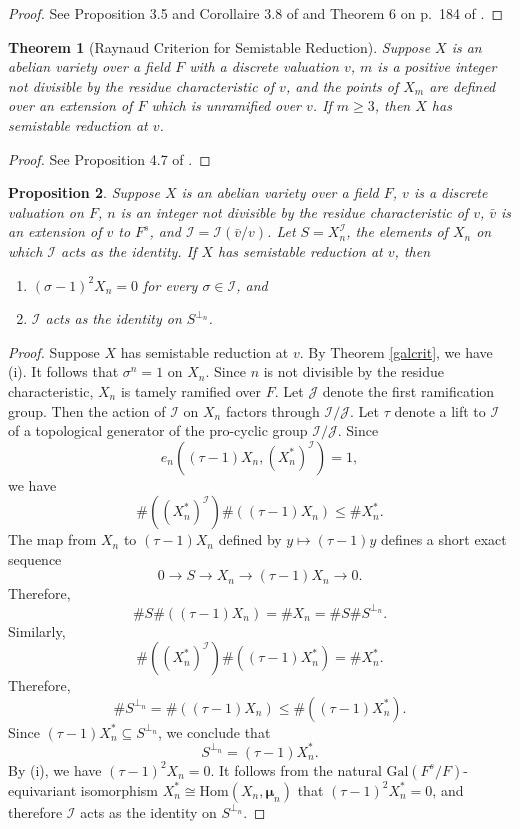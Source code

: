 \documentclass{amsart}
\def\Gal{\mathrm{Gal}}
\def\Hom{\mathrm{Hom}}
\def\I{{\mathcal I}}
\def\J{{\mathcal J}}
\def\bmu{\boldsymbol \mu}
\newtheorem{thm}{Theorem}[section]
\newtheorem{prop}[thm]{Proposition}
\theoremstyle{definition}
\begin{document}
\begin{proof}
See Proposition 3.5 and Corollaire 3.8 of \cite{SGA} 
and Theorem 6 on p.~184 of \cite{BLR}.
\end{proof}

\begin{thm}[Raynaud Criterion for Semistable Reduction]
\label{raynaud}
\hfil Suppose $X$ is an abelian variety over a field $F$ with a 
discrete valuation $v$, $m$ is a positive integer not divisible by the
residue characteristic of $v$, and the points of $X_m$ are defined
over an extension of $F$ which is unramified over $v$. If $m \ge 3$, then $X$ has
semistable reduction at $v$. 
\end{thm}

\begin{proof}
See Proposition 4.7 of \cite{SGA}.
\end{proof}

\begin{prop}
\label{sslem}
Suppose $X$ is an abelian variety over a field $F$, $v$ is a discrete 
valuation on $F$, $n$ is an integer not 
divisible by the residue characteristic of $v$,  
${\bar v}$ is an extension of $v$ to $F^s$,
and $\I = \I({\bar v}/v)$. Let $S = X_n^\I$, the elements of
$X_n$ on which $\I$ acts as the identity. If
$X$ has semistable reduction at $v$, then
\begin{enumerate}
\item[{(i)}] $(\sigma - 1)^2 X_n = 0$ for every $\sigma \in \I$, and
\item[{(ii)}] $\I$ acts as the identity on $S^{\perp_n}$.
\end{enumerate}
\end{prop}

\begin{proof}
Suppose $X$ has semistable reduction at $v$.
By Theorem \ref{galcrit}, we have (i).
It follows that $\sigma^n = 1$ on $X_n$. Since $n$ is 
not divisible by the residue characteristic, $X_n$ is tamely ramified
over $F$. Let $\J$ denote the first ramification group. Then the
action of $\I$ on $X_n$ factors through $\I/\J$. Let $\tau$ denote
a lift to $\I$ of a topological generator of the pro-cyclic group
$\I/\J$. Since 
$$e_n((\tau - 1)X_n,(X_n^\ast)^\I) = 1,$$
we have 
$$\#((X_n^\ast)^\I)\#((\tau - 1)X_n) \le \#X_n^\ast.$$
The map from $X_n$ to $(\tau - 1)X_n$ defined by
$y \mapsto (\tau - 1)y$ defines a short exact sequence
$$0 \to S \to X_n \to (\tau - 1)X_n \to 0.$$
Therefore, 
$$\#S\#((\tau - 1)X_n) = \#X_n = \#S\#S^{\perp_n}.$$
Similarly, 
$$\#((X_n^\ast)^\I)\#((\tau - 1)X_n^\ast) = \#X_n^\ast.$$
Therefore, 
$$\#S^{\perp_n} = \#((\tau - 1)X_n) \le \#((\tau - 1)X_n^\ast).$$
Since $(\tau - 1)X_n^\ast \subseteq S^{\perp_n}$,
we conclude that 
$$S^{\perp_n} = (\tau - 1)X_n^\ast.$$
By (i),
we have $(\tau - 1)^2X_n = 0$. It follows from the natural
$\Gal(F^s/F)$-equivariant isomorphism 
$X_n^\ast \cong \Hom(X_n,\bmu_n)$ that $(\tau - 1)^2X_n^\ast = 0$,
and therefore $\I$ acts as the identity on $S^{\perp_n}$.
\end{proof}
\end{document}
